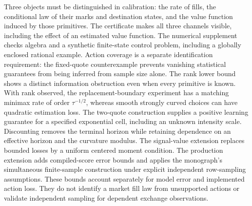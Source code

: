 \documentclass[11pt]{article}
\theoremstyle{plain}
\theoremstyle{definition}
\theoremstyle{remark}
\begin{document}
Three objects must be distinguished in calibration: the rate of fills,
the conditional law of their marks and destination states, and the value
function induced by those primitives. The certificate makes all three
channels visible, including the effect of an estimated value function.
The numerical supplement checks algebra and a synthetic finite-state
control problem, including a globally enclosed rational example.
Action coverage is a separate identification requirement: the
fixed-quote counterexample prevents vanishing statistical guarantees
from being inferred from sample size alone. The rank lower bound shows a distinct
information obstruction even when every primitive is known.
With rank observed, the replacement-boundary experiment has a
matching minimax rate of order \(\tau^{-1/2}\), whereas smooth
strongly curved choices can have quadratic estimation loss.
The two-quote construction
supplies a positive learning guarantee for a specified exponential cell,
including an unknown intensity scale. Discounting removes the terminal
horizon while retaining dependence on an effective horizon and the
curvature modulus. The signal-value extension replaces bounded losses
by a uniform centered moment condition. The production extension adds compiled-score error bounds and applies
the monograph's simultaneous finite-sample construction under explicit
independent row-sampling assumptions. These bounds account separately for model error and implemented
action loss. They do not identify a market fill law from unsupported actions
or validate independent sampling for dependent exchange observations.

\setlength{\bibsep}{3pt plus 0.5pt minus 0.5pt}


\end{document}
